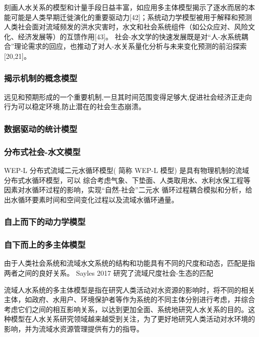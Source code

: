 
刻画人水关系的模型和计量手段日益丰富，如应用多主体模型揭示了逐水而居的本能可能是人类早期迁徙演化的重要驱动力[42]；系统动力学模型被用于解释和预测人类社会面对流域频发的洪水灾害时，水文和社会系统组件（如公众应对、风险文化、经济发展等）的互馈作用[43]。 社会-水文学的快速发展既是对“人-水系统耦合”理论需求的回应，也推动了对人-水关系量化分析与未来变化预测的前沿探索[20,21]。

\subsubsection*{揭示机制的概念模型}

远见和预期形成的一个重要机制,一旦其时间范围变得足够大,促进社会经济正走向行为可以稳定环境,防止潜在的社会生态崩溃。

\subsubsection*{数据驱动的统计模型}


\subsubsection*{分布式社会-水文模型}

WEP-L 分布式流域二元水循环模型( 简称 WEP-L 模型) 是具有物理机制的流域分布式水循环模型，可以 综合考虑气象、下垫面、人类取用水、水利水保工程等因素对水循环过程的影响，实现“自然-社会”二元水 循环过程耦合模拟和分析，给出水循环要素时间和空间变化过程以及流域水循环通量。

\subsubsection*{自上而下的动力学模型}


\subsubsection*{自下而上的多主体模型}

由于人类社会系统和流域水文系统的结构和功能具有不同的尺度和动态，匹配是指两者之间的良好关系。
Sayles 2017 研究了流域尺度社会-生态的匹配

流域人水系统的多主体模型是指在研究人类活动对水资源的影响时，将不同的相关主体，如政府、水用户、环境保护者等作为系统的不同主体分别进行考虑，并综合考虑它们之间的相互影响关系，以达到更加全面、系统地研究人水关系的目的。这种模型在人水关系研究领域越来越受到关注，为了更好地研究人类活动对水环境的影响，并为流域水资源管理提供有力的指导。

